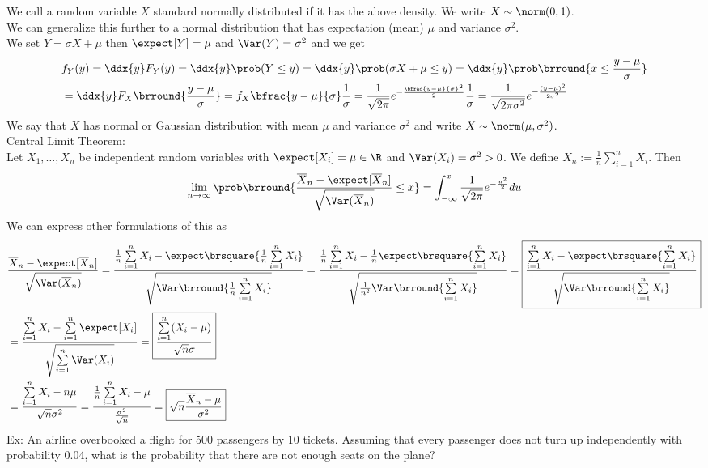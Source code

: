 We call a random variable $X$ standard normally distributed if it has the above density. We write $X\sim\norm(0,1)$.\\
We can generalize this further to a normal distribution that has expectation (mean) $\mu$ and variance $\sigma^2$.\\
We set $Y=\sigma X+\mu$ then $\expect[Y]=\mu$ and $\Var(Y)=\sigma^2$ and we get
\begin{align*}
    &f_Y(y)=\ddx{y}F_Y(y)=\ddx{y}\prob(Y\leq y)=\ddx{y}\prob(\sigma X+\mu\leq y)=\ddx{y}\prob\brround{x\leq\frac{y-\mu}{\sigma}}\\
    &=\ddx{y}F_X\brround{\frac{y-\mu}{\sigma}}=f_X\bfrac{y-\mu}{\sigma}\frac{1}{\sigma}=\frac{1}{\sqrt{2\pi}}e^{-\frac{\bfrac{y-\mu}{\sigma}^2}{2}}\frac{1}{\sigma}=\frac{1}{\sqrt{2\pi\sigma^2}}e^{-\frac{(y-\mu)^2}{2\sigma^2}}
\end{align*}
We say that $X$ has normal or Gaussian distribution with mean $\mu$ and variance $\sigma^2$ and write $X\sim\norm(\mu,\sigma^2)$.\\
Central Limit Theorem:\\
Let $X_1,\ldots, X_n$ be independent random variables with $\expect[X_i]=\mu\in\R$ and $\Var(X_i)=\sigma^2>0$. We define $\overline{X}_n:=\frac{1}{n}\sum\limits_{i=1}^n X_i$. Then
\[\lim_{n\to\infty}\prob\brround{\frac{\overline{X}_n-\expect[\overline{X}_n]}{\sqrt{\Var(\overline{X}_n)}}\leq x}=\int_{-\infty}^x\frac{1}{\sqrt{2\pi}}e^{-\frac{u^2}{2}}du\]
We can express other formulations of this as
\begin{align*}
    &\frac{\overline{X}_n-\expect[\overline{X}_n]}{\sqrt{\Var(\overline{X}_n)}}=\frac{\frac{1}{n}\sum\limits_{i=1}^n X_i-\expect\brsquare{\frac{1}{n}\sum\limits_{i=1}^n X_i}}{\sqrt{\Var\brround{\frac{1}{n}\sum\limits_{i=1}^n X_i}}}=\frac{\frac{1}{n}\sum\limits_{i=1}^n X_i-\frac{1}{n}\expect\brsquare{\sum\limits_{i=1}^n X_i}}{\sqrt{\frac{1}{n^2}\Var\brround{\sum\limits_{i=1}^n X_i}}}=\boxed{\frac{\sum\limits_{i=1}^n X_i-\expect\brsquare{\sum\limits_{i=1}^n X_i}}{\sqrt{\Var\brround{\sum\limits_{i=1}^n X_i}}}}\\
    &=\frac{\sum\limits_{i=1}^n X_i-\sum\limits_{i=1}^n\expect[X_i]}{\sqrt{\sum\limits_{i=1}^n\Var(X_i)}}=\boxed{\frac{\sum\limits_{i=1}^n (X_i-\mu)}{\sqrt{n}\sigma}}\\
    &=\frac{\sum\limits_{i=1}^n X_i-n\mu}{\sqrt{n}\sigma^2}=\frac{\frac{1}{n}\sum\limits_{i=1}^n X_i-\mu}{\frac{\sigma^2}{\sqrt{n}}}=\boxed{\sqrt{n}\frac{\overline{X}_n-\mu}{\sigma^2}}
\end{align*}
Ex: An airline overbooked a flight for 500 passengers by 10 tickets. Assuming that every passenger does not turn up independently with probability 0.04, what is the probability that there are not enough seats on the plane?\\
